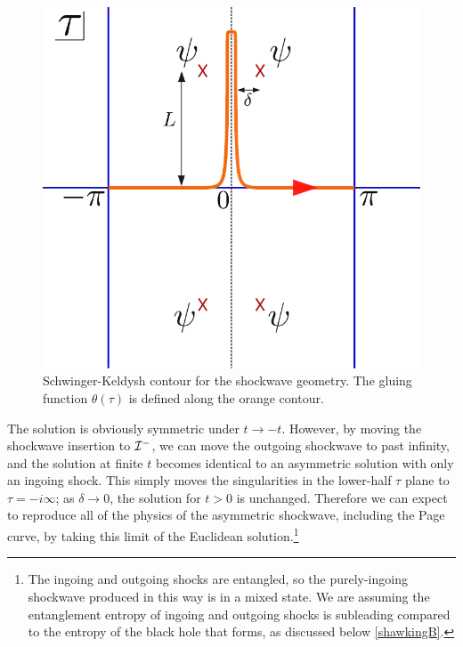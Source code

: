 \documentclass[12pt]{article}
\numberwithin{equation}{section}
\begin{document}
\begin{spacing}{1.1}
\begin{figure}[th]
\begin{center}
\includegraphics[scale=0.65]{figures/skcontour_background.pdf}
\end{center}
\caption{Schwinger-Keldysh contour for the shockwave geometry. The gluing function $\theta(\tau)$ is defined along the orange contour. \label{fig:SKbackground}}
\end{figure}

The solution is obviously symmetric under $t \to -t$. However, by moving the shockwave insertion to ${\cal I}^-$, we can move the outgoing shockwave to past infinity, and the solution at finite $t$ becomes identical to an asymmetric solution with only an ingoing shock.  This simply moves the singularities in the lower-half $\tau$ plane to $\tau = -i\infty$; as $\delta \to 0$, the solution for $t>0$ is unchanged. Therefore we can expect to reproduce all of the physics of the asymmetric shockwave, including the Page curve, by taking this limit of the Euclidean solution.\footnote{The ingoing and outgoing shocks are entangled, so the purely-ingoing shockwave produced in this way is in a mixed state. We are assuming the entanglement entropy of ingoing and outgoing shocks is subleading compared to the entropy of the black hole that forms, as discussed below \eqref{shawkingB}.}




\end{spacing}
\end{document}
